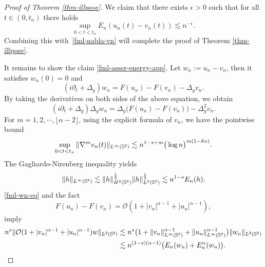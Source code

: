 \documentclass[10pt,a4paper]{amsart}
\numberwithin{equation}{section}
\begin{document}
\begin{proof}[Proof of Theorem \ref{thm-illpose}]
We claim that there exists $\epsilon>0$ such that  for all $t\in(0,t_n)$ there holds
\begin{equation}\label{fml-asser-energy-app}
\sup_{0<t<t_n}E_n(u_n(t)-v_n(t)) \lesssim n^{-\epsilon}.
\end{equation} 
Combining this with~\eqref{fml-nabla-vn} will  complete the proof of Theorem \ref{thm-illpose}.
		
It remains to show the claim \eqref{fml-asser-energy-app}. Let $w_n := u_n - v_n$, then it satisfies $w_n(0)=0$ and 
\begin{equation}\label{fml-wn-eq}
(i\partial_t + \Delta_g)w_n = F(u_n)-F(v_n)-\Delta_g v_n.
\end{equation}
By taking the derivatives on both sides of the above equation, we obtain
\begin{equation}\label{fml-nab-wn-eq}
(i\partial_t + \Delta_g)\Delta_g w_n =\Delta_g \big(F(u_n)-F(v_n)\big)-\Delta_g^2 v_n.
\end{equation}
For $m=1,2,\cdots,\lfloor \alpha-2\rfloor$, using the explicit formula of $v_n$, we have the pointwise bound
\begin{equation}\label{fml-v-deri-Linf}
\sup_{0<t<t_n}\|\nabla^m v_n(t)\|_{L^\infty(\Bbb S^2)} \lesssim n^{1-s+m} \big(\log n\big)^{m(1-\delta \alpha)}.
\end{equation}
The Gagliardo-Nirenberg inequality yields
\begin{equation}\label{fml-GN-ineq}
\|h\|_{L^\infty(\Bbb S^2)} \lesssim \|h\|^{\frac{1}{2}}_{H^2(\Bbb S^2)} \|h\|^{\frac{1}{2}}_{L^2(\Bbb S^2)} \lesssim n^{1-s} E_n(h).
\end{equation}
\eqref{fml-wn-eq} and the fact  
\begin{equation*}
F(u_n)-F(v_n) = \mathcal{O}(1+|v_n|^{\alpha-1}+|u_n|^{\alpha-1}),
\end{equation*}
imply 
\begin{align}\nonumber
n^{s}\| \mathcal{O}(1+|v_n|^{\alpha-1}+|u_n|^{\alpha-1}) w\|_{L^2(\Bbb S^2)} &\lesssim n^{s} \big( 1 + \|v_n\|^{\alpha-1}_{L^\infty(\Bbb S^2)} + \|u_n\|^{\alpha-1}_{L^\infty(\Bbb S^2)} \big) \|w_n\|_{L^2(\Bbb S^2)}\\\label{fml-En-T1}
&\lesssim n^{(1-s)(\alpha-1)} \big( E_n(w_n) + E^\alpha_n(w_n) \big).
\end{align}
		

\end{proof}
\end{document}

